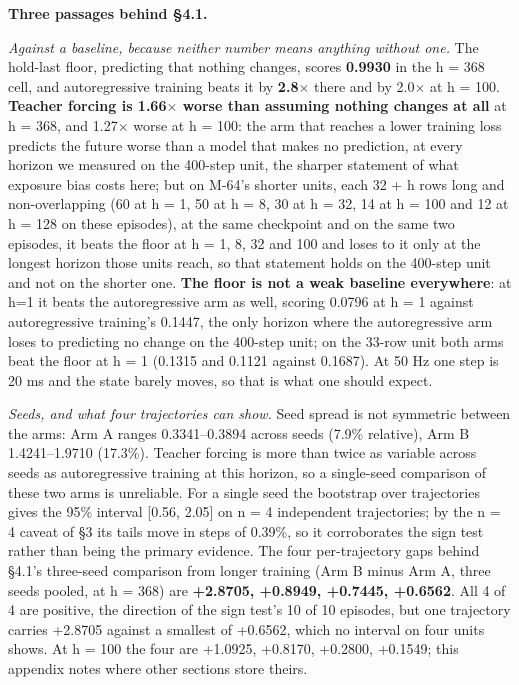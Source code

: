\documentclass[10pt]{article}
\begin{document}
\textbf{Three passages behind \S{}4.1.}

\emph{Against a baseline, because neither number means anything without one.} The hold-last floor, predicting that nothing changes, scores \textbf{0.9930} in the h = 368 cell, and autoregressive training beats it by \textbf{2.8$\times$} there and by 2.0$\times$ at h = 100. \textbf{Teacher forcing is 1.66$\times$ worse than assuming nothing changes at all} at h = 368, and 1.27$\times$ worse at h = 100: the arm that reaches a lower training loss predicts the future worse than a model that makes no prediction, at every horizon we measured on the 400-step unit, the sharper statement of what exposure bias costs here; but on M-64's shorter units, each 32 + h rows long and non-overlapping (60 at h = 1, 50 at h = 8, 30 at h = 32, 14 at h = 100 and 12 at h = 128 on these episodes), at the same checkpoint and on the same two episodes, it beats the floor at h = 1, 8, 32 and 100 and loses to it only at the longest horizon those units reach, so that statement holds on the 400-step unit and not on the shorter one. \textbf{The floor is not a weak baseline everywhere}: at h=1 it beats the autoregressive arm as well, scoring 0.0796 at h = 1 against autoregressive training's 0.1447, the only horizon where the autoregressive arm loses to predicting no change on the 400-step unit; on the 33-row unit both arms beat the floor at h = 1 (0.1315 and 0.1121 against 0.1687). At 50 Hz one step is 20 ms and the state barely moves, so that is what one should expect.

\emph{Seeds, and what four trajectories can show.} Seed spread is not symmetric between the arms: Arm A ranges 0.3341--0.3894 across seeds (7.9\% relative), Arm B 1.4241--1.9710 (17.3\%). Teacher forcing is more than twice as variable across seeds as autoregressive training at this horizon, so a single-seed comparison of these two arms is unreliable. For a single seed the bootstrap over trajectories gives the 95\% interval [0.56, 2.05] on n = 4 independent trajectories; by the n = 4 caveat of \S{}3 its tails move in steps of 0.39\%, so it corroborates the sign test rather than being the primary evidence. The four per-trajectory gaps behind \S{}4.1's three-seed comparison from longer training (Arm B minus Arm A, three seeds pooled, at h = 368) are \textbf{+2.8705, +0.8949, +0.7445, +0.6562}. All 4 of 4 are positive, the direction of the sign test's 10 of 10 episodes, but one trajectory carries +2.8705 against a smallest of +0.6562, which no interval on four units shows. At h = 100 the four are +1.0925, +0.8170, +0.2800, +0.1549; this appendix notes where other sections store theirs.
\end{document}
